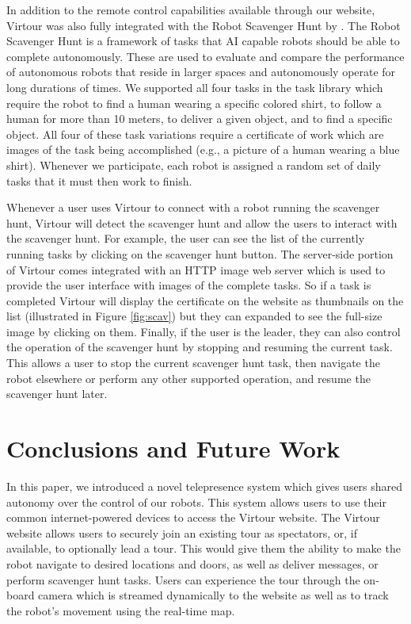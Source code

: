 \documentclass[
  oneside,
  11pt, a4paper,
  footinclude=true,
  headinclude=true,
  cleardoublepage=empty
]{article}
\begin{document}
In addition to the remote control capabilities available through our website,
Virtour was also fully integrated with the Robot Scavenger Hunt
by \citet{zhang2016}.  The Robot Scavenger Hunt is a framework of tasks that AI
capable robots should be able to complete autonomously. These are used to
evaluate and compare the performance of autonomous robots that reside in larger
spaces and autonomously operate for long durations of times. We supported all
four tasks in the task library which require the robot to find a human wearing
a specific colored shirt, to follow a human for more than 10 meters, to deliver
a given object, and to find a specific object. All four of these task
variations require a certificate of work which are images of the task being
accomplished (e.g., a picture of a human wearing a blue shirt). Whenever we
participate, each robot is assigned a random set of daily tasks that it must
then work to finish.

Whenever a user uses Virtour to connect with a robot running the scavenger
hunt, Virtour will detect the scavenger hunt and allow the users to interact
with the scavenger hunt. For example, the user can see the list of the
currently running tasks by clicking on the scavenger hunt button. The
server-side portion of Virtour comes integrated with an HTTP image web server
which is used to provide the user interface with images of the complete tasks.
So if a task is completed Virtour will display the certificate on the website
as thumbnails on the list (illustrated in Figure \ref{fig:scav}) but they can
expanded to see the full-size image by clicking on them. Finally, if the user
is the leader, they can also control the operation of the scavenger hunt by
stopping and resuming the current task. This allows a user to stop the current
scavenger hunt task, then navigate the robot elsewhere or perform any other
supported operation, and resume the scavenger hunt later.

\section{Conclusions and Future Work}\label{sec:conclusion}

In this paper, we introduced a novel telepresence system which gives users
shared autonomy over the control of our robots. This system allows users to use
their common internet-powered devices to access the Virtour website. The
Virtour website allows users to securely join an existing tour as spectators,
or, if available, to optionally lead a tour. This would give them the ability
to make the robot navigate to desired locations and doors, as well as deliver
messages, or perform scavenger hunt tasks. Users can experience the tour
through the on-board camera which is streamed dynamically to the website as
well as to track the robot's movement using the real-time map.
\end{document}
